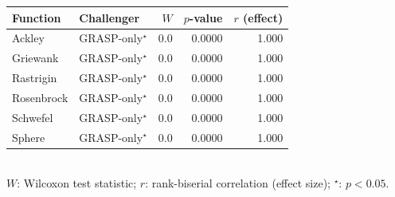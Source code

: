 \begin{table}[htb]
\medskip
\begin{tabular}{llrrr}
\toprule
Function & Challenger & $W$ & $p$-value & $r$ (effect) \\
\midrule
  Ackley & GRASP-only$^\star$ & 0.0 & 0.0000 & 1.000 \\
  Griewank & GRASP-only$^\star$ & 0.0 & 0.0000 & 1.000 \\
  Rastrigin & GRASP-only$^\star$ & 0.0 & 0.0000 & 1.000 \\
  Rosenbrock & GRASP-only$^\star$ & 0.0 & 0.0000 & 1.000 \\
  Schwefel & GRASP-only$^\star$ & 0.0 & 0.0000 & 1.000 \\
  Sphere & GRASP-only$^\star$ & 0.0 & 0.0000 & 1.000 \\
\bottomrule
\end{tabular}
\\ \footnotesize{$W$: Wilcoxon test statistic; $r$: rank-biserial correlation (effect size); $^\star$: $p < 0.05$.}
\end{table}